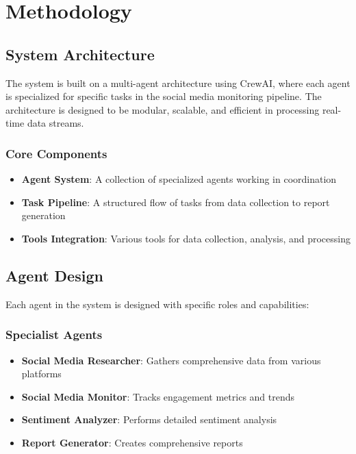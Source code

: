 \section{Methodology}

\subsection{System Architecture}
The system is built on a multi-agent architecture using CrewAI, where each agent is specialized for specific tasks in the social media monitoring pipeline. The architecture is designed to be modular, scalable, and efficient in processing real-time data streams.

\subsubsection{Core Components}
\begin{itemize}
    \item \textbf{Agent System}: A collection of specialized agents working in coordination
    \item \textbf{Task Pipeline}: A structured flow of tasks from data collection to report generation
    \item \textbf{Tools Integration}: Various tools for data collection, analysis, and processing
\end{itemize}

\subsection{Agent Design}
Each agent in the system is designed with specific roles and capabilities:

\subsubsection{Specialist Agents}
\begin{itemize}
    \item \textbf{Social Media Researcher}: Gathers comprehensive data from various platforms
    \item \textbf{Social Media Monitor}: Tracks engagement metrics and trends
    \item \textbf{Sentiment Analyzer}: Performs detailed sentiment analysis
    \item \textbf{Report Generator}: Creates comprehensive reports
\end{itemize}

